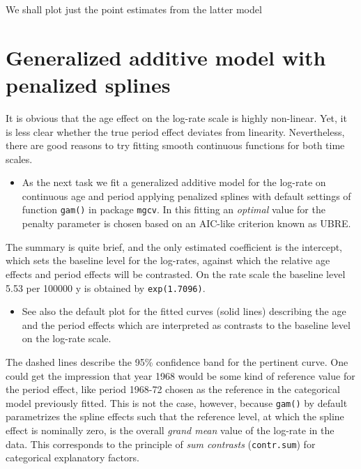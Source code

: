 \documentclass[
]{book}
\providecommand{\tightlist}{%
  \setlength{\itemsep}{0pt}\setlength{\parskip}{0pt}}
\begin{document}
We shall plot just the point estimates from the latter model

\section{Generalized additive model with penalized splines}\label{generalized-additive-model-with-penalized-splines}

It is obvious that the age effect on the log-rate scale is highly
non-linear. Yet, it is less clear whether the true period effect
deviates from linearity. Nevertheless, there are good reasons to
try fitting smooth continuous functions for both time scales.

\begin{itemize}
\tightlist
\item
  As the next task we fit a generalized additive model for the
  log-rate on continuous age and period applying penalized splines
  with default settings of function \texttt{gam()} in package
  \texttt{mgcv}. In this fitting an \emph{optimal} value for the penalty
  parameter is chosen based on an AIC-like criterion known as UBRE.
\end{itemize}

The summary is quite brief, and the only estimated coefficient is the
intercept, which sets the baseline level for the log-rates, against
which the relative age effects and period effects will be contrasted.
On the rate scale the baseline level 5.53 per 100000 y is obtained by
\texttt{exp(1.7096)}.

\begin{itemize}
\tightlist
\item
  See also the default plot for the fitted curves (solid lines)
  describing the age and the period effects which are interpreted as
  contrasts to the baseline level on the log-rate scale.
\end{itemize}

The dashed lines describe the 95\% confidence band for the pertinent
curve. One could get the impression that year 1968 would be some kind
of reference value for the period effect, like period 1968-72
chosen as the reference in the categorical
model previously fitted. This is not the case, however, because
\texttt{gam()} by default parametrizes the spline effects such that the
reference level, at which the spline effect is nominally zero, is the
overall \emph{grand mean} value of the log-rate in the data. This
corresponds to the principle of \emph{sum contrasts} (\texttt{contr.sum})
for categorical explanatory factors.
\end{document}
